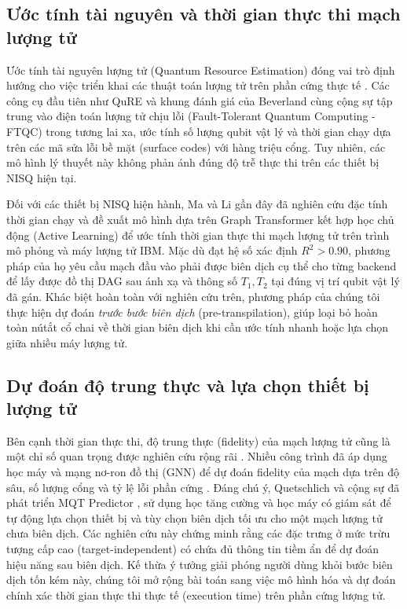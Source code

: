 \documentclass[11pt, a4paper]{article}
\begin{document}
\subsection{Ước tính tài nguyên và thời gian thực thi mạch lượng tử}
Ước tính tài nguyên lượng tử (Quantum Resource Estimation) đóng vai trò định hướng cho việc triển khai các thuật toán lượng tử trên phần cứng thực tế \cite{quetschlich2024utilizing}. Các công cụ đầu tiên như QuRE \cite{suchara2013qure} và khung đánh giá của Beverland cùng cộng sự \cite{beverland2022assessing} tập trung vào điện toán lượng tử chịu lỗi (Fault-Tolerant Quantum Computing - FTQC) trong tương lai xa, ước tính số lượng qubit vật lý và thời gian chạy dựa trên các mã sửa lỗi bề mặt (surface codes) với hàng triệu cổng. Tuy nhiên, các mô hình lý thuyết này không phản ánh đúng độ trễ thực thi trên các thiết bị NISQ hiện tại.

Đối với các thiết bị NISQ hiện hành, Ma và Li \cite{ma2025understanding} gần đây đã nghiên cứu đặc tính thời gian chạy và đề xuất mô hình dựa trên Graph Transformer kết hợp học chủ động (Active Learning) để ước tính thời gian thực thi mạch lượng tử trên trình mô phỏng và máy lượng tử IBM. Mặc dù đạt hệ số xác định $R^2 > 0.90$, phương pháp của họ yêu cầu mạch đầu vào phải được biên dịch cụ thể cho từng backend để lấy được đồ thị DAG sau ánh xạ và thông số $T_1, T_2$ tại đúng vị trí qubit vật lý đã gán. Khác biệt hoàn toàn với nghiên cứu trên, phương pháp của chúng tôi thực hiện dự đoán \textit{trước bước biên dịch} (pre-transpilation), giúp loại bỏ hoàn toàn nútắt cổ chai về thời gian biên dịch khi cần ước tính nhanh hoặc lựa chọn giữa nhiều máy lượng tử.

\subsection{Dự đoán độ trung thực và lựa chọn thiết bị lượng tử}
Bên cạnh thời gian thực thi, độ trung thực (fidelity) của mạch lượng tử cũng là một chỉ số quan trọng được nghiên cứu rộng rãi \cite{gilyen2022improved}. Nhiều công trình đã áp dụng học máy và mạng nơ-ron đồ thị (GNN) để dự đoán fidelity của mạch dựa trên độ sâu, số lượng cổng và tỷ lệ lỗi phần cứng \cite{vadali2024quantum, wang2022quest}. Đáng chú ý, Quetschlich và cộng sự đã phát triển MQT Predictor \cite{quetschlich2023mqtpredictor, quetschlich2023predicting}, sử dụng học tăng cường và học máy có giám sát để tự động lựa chọn thiết bị và tùy chọn biên dịch tối ưu cho một mạch lượng tử chưa biên dịch. Các nghiên cứu này chứng minh rằng các đặc trưng ở mức trừu tượng cấp cao (target-independent) có chứa đủ thông tin tiềm ẩn để dự đoán hiệu năng sau biên dịch. Kế thừa ý tưởng giải phóng người dùng khỏi bước biên dịch tốn kém này, chúng tôi mở rộng bài toán sang việc mô hình hóa và dự đoán chính xác thời gian thực thi thực tế (execution time) trên phần cứng lượng tử.
\end{document}
